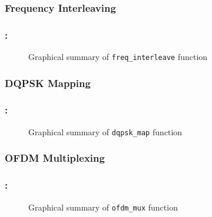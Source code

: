 \documentclass[class=beamer,10pt,crop=false]{standalone}
\begin{document}
\subsubsection{Frequency Interleaving}
\begin{frame}
    \label{slide:dab-proc_freq-interleave}
    \frametitle{\subsecname : \subsubsecname}
    
    \begin{figure}[htbp]
        \centering
        \captionsetup{type=figure}
        \def\svgwidth{\linewidth}
        {\linespread{0.8}
            \scriptsize
            }
        \caption{Graphical summary of \texttt{freq\_interleave} function}
        \label{fig:freq_interleave}
      \end{figure}
      
\end{frame}

\subsubsection{DQPSK Mapping}
\begin{frame}
    \label{slide:dab-proc_dqpsk-map}
    \frametitle{\subsecname : \subsubsecname}
    
    \begin{figure}[htbp]
        \centering
        \captionsetup{type=figure}
        \def\svgwidth{0.9\linewidth}
        {\linespread{0.8}
            \scriptsize
            }
        \caption{Graphical summary of \texttt{dqpsk\_map} function}
        \label{fig:dqpsk_map}
      \end{figure}
      
\end{frame}

\subsubsection{OFDM Multiplexing}
\begin{frame}
    \label{slide:dab-proc_ofdm-mux}
    \frametitle{\subsecname : \subsubsecname}
    
    \begin{figure}[htbp]
        \centering
        \captionsetup{type=figure}
        \def\svgwidth{\linewidth}
        {\linespread{0.8}
            \scriptsize
            }
        \caption{Graphical summary of \texttt{ofdm\_mux} function}
        \label{fig:ofdm_mux}
      \end{figure}
      
\end{frame}
\end{document}
